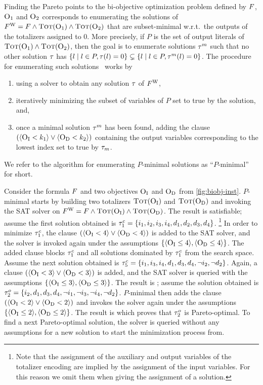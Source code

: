 Finding the Pareto points to the bi-objective optimization problem defined by $F$, $\textsc{O}_1$ and $\textsc{O}_2$ corresponds to enumerating the solutions of $F^\text{W} = F \land \textsc{Tot}(\textsc{O}_1) \land \textsc{Tot}(\textsc{O}_2)$ that are subset-minimal w.r.t.\ the outputs of the totalizers assigned to 0.
More precisely, if $P$ is the set of output literals of $\textsc{Tot}(\textsc{O}_1) \land \textsc{Tot}(\textsc{O}_2)$, then the goal is to enumerate solutions $\tau^m$ such that no other solution $\tau$ has $\{ l \mid l \in P, \tau(l) = 0 \} \subsetneq \{ l \mid l \in P, \tau^m(l) = 0 \}$.
The procedure for enumerating such solutions~\autocite{DBLP:conf/ftp/KoshimuraNFH09} works by
\begin{enumerate}[label=(\roman*)]
  \item using a solver to obtain any solution $\tau$ of $F^\text{W}$,
  \item iteratively minimizing the subset of variables of $P$ set to true by the solution, and,
  \item once a minimal solution $\tau^m$ has been found, adding the clause $(\langle \textsc{O}_{\text{I}} < k_1 \rangle \lor \langle \textsc{O}_{\text{D}} < k_2 \rangle)$ containing the output variables corresponding to the lowest index set to true by $\tau_m$.
\end{enumerate}
We refer to the algorithm for enumerating $P$-minimal solutions as ``$P$-minimal'' for short.

\begin{example}\label{ex:pmin}
  Consider the formula $F$ and two objectives $\textsc{O}_{\text{I}}$ and $\textsc{O}_{\text{D}}$ from \cref{fig:biobj-inst}.
  $P$-minimal starts by building two totalizers $\textsc{Tot}(\textsc{O}_{\text{I}})$ and $\textsc{Tot}(\textsc{O}_{\text{D}})$ and invoking the SAT solver on $F^\text{W} = F \land \textsc{Tot}(\textsc{O}_{\text{I}}) \land \textsc{Tot}(\textsc{O}_{\text{D}})$.
  The result is satisfiable;
  assume the first solution obtained is $\tau^c_1 = \{i_1,\allowbreak i_2,\allowbreak i_3,\allowbreak i_4,\allowbreak d_1,\allowbreak d_2,\allowbreak d_3,\allowbreak d_4\}$.%
  \footnote{Note that the assignment of the auxiliary and output variables of the totalizer encoding are implied by the assignment of the input variables. For this reason we omit them when giving the assignment of a solution.} 
  In order to minimize $\tau^c_1$, the clause $(\langle \textsc{O}_{\text{I}} < 4 \rangle \lor \langle \textsc{O}_{\text{D}} < 4 \rangle)$ is added to the SAT solver, and the solver is invoked again under the assumptions $\{ \langle \textsc{O}_{\text{I}} \leq 4 \rangle, \langle \textsc{O}_{\text{D}} \leq 4 \rangle \}$.
  The added clause blocks $\tau^c_1$ and all solutions dominated by $\tau^c_1$ from the search space.
  Assume the next solution obtained is $\tau^c_5 = \{i_1,\allowbreak i_3,\allowbreak i_4,\allowbreak d_1,\allowbreak d_3,\allowbreak d_4,\allowbreak \lnot i_2,\allowbreak \lnot d_2\}$. 
  Again, a clause $(\langle \textsc{O}_{\text{I}} < 3 \rangle \lor \langle \textsc{O}_{\text{D}} < 3 \rangle)$ is added, and the SAT solver is queried with the assumptions $\{ \langle \textsc{O}_{\text{I}} \leq 3 \rangle, \langle \textsc{O}_{\text{D}} \leq 3 \rangle \}$.
  The result is \sat{};
  assume the solution obtained is $\tau^o_2 = \{i_2,\allowbreak d_1,\allowbreak d_3,\allowbreak d_4,\allowbreak \lnot i_1,\allowbreak \lnot i_3,\allowbreak \lnot i_4,\allowbreak \lnot d_2\}$. 
  $P$-minimal then adds the clause $(\langle \textsc{O}_{\text{I}} < 2 \rangle \lor \langle \textsc{O}_{\text{D}} < 2 \rangle)$ and invokes the solver again under the assumptions $\{ \langle \textsc{O}_{\text{I}} \leq 2 \rangle, \langle \textsc{O}_{\text{D}} \leq 2 \rangle \}$.
  The result is \unsat{} which proves that $\tau^o_2$ is Pareto-optimal. 
  To find a next Pareto-optimal solution, the solver is queried without any assumptions for a new solution to start the minimization process from.
\end{example}

